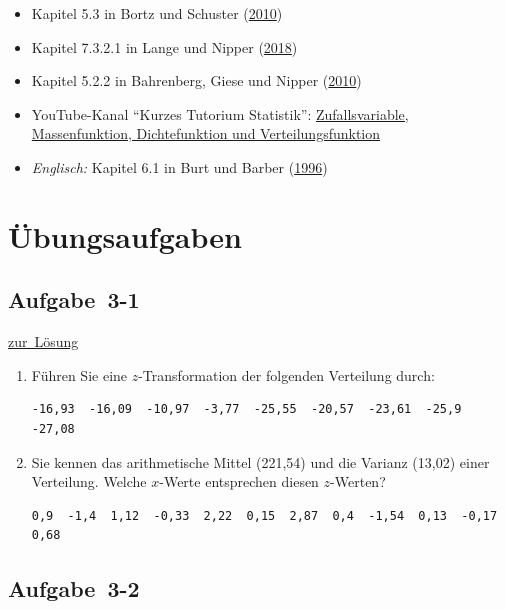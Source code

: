 \documentclass[
  11pt,
  ngerman,
  a4paper,
]{report}
\providecommand{\tightlist}{%
  \setlength{\itemsep}{0pt}\setlength{\parskip}{0pt}}
\begin{document}
\begin{itemize}
\tightlist
\item
  Kapitel 5.3 in Bortz und Schuster (\protect\hyperlink{ref-bortz}{2010})
\item
  Kapitel 7.3.2.1 in Lange und Nipper (\protect\hyperlink{ref-delange}{2018})
\item
  Kapitel 5.2.2 in Bahrenberg, Giese und Nipper (\protect\hyperlink{ref-bahrenberg}{2010})
\item
  YouTube-Kanal \enquote{Kurzes Tutorium Statistik}: \href{https://www.youtube.com/watch?v=DoHTsDrzAQk}{Zufallsvariable, Massenfunktion, Dichtefunktion und Verteilungsfunktion}
\item
  \emph{Englisch:} Kapitel 6.1 in Burt und Barber (\protect\hyperlink{ref-burt}{1996})
\end{itemize}

\hypertarget{uxfcbungsaufgaben-2}{%
\section*{Übungsaufgaben}\label{uxfcbungsaufgaben-2}}

\hypertarget{aufgabe-3-1}{%
\subsection{Aufgabe~3-1}\label{aufgabe-3-1}}

\protect\hyperlink{loesung-3-1}{zur~Lösung}

\begin{enumerate}
\def\labelenumi{\alph{enumi})}
\item
  Führen Sie eine \(z\)-Transformation der folgenden Verteilung durch:

\begin{verbatim}
-16,93  -16,09  -10,97  -3,77  -25,55  -20,57  -23,61  -25,9  -27,08
\end{verbatim}
\item
  Sie kennen das arithmetische Mittel (221,54) und die Varianz (13,02) einer Verteilung. Welche \(x\)-Werte entsprechen diesen \(z\)-Werten?

\begin{verbatim}
0,9  -1,4  1,12  -0,33  2,22  0,15  2,87  0,4  -1,54  0,13  -0,17  0,68
\end{verbatim}
\end{enumerate}

\hypertarget{aufgabe-3-2}{%
\subsection{Aufgabe~3-2}\label{aufgabe-3-2}}
\end{document}
